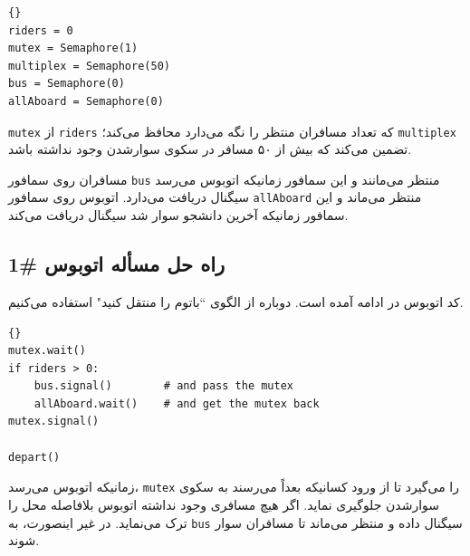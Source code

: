 \documentclass{book}
\newcommand{\clearemptydoublepage}{\newpage\cleardoublepage}
\begin{document}
\begin{latin}
\begin{lstlisting}[title=\rl{راهنمای مسأله اتوبوس}]{}
riders = 0
mutex = Semaphore(1)
multiplex = Semaphore(50)
bus = Semaphore(0)
allAboard = Semaphore(0)
\end{lstlisting}
\end{latin}

    {\tt mutex}
    از  {\tt riders} که تعداد مسافران منتظر را نگه می‌دارد محافظ می‌کند؛ {\tt multiplex} تضمین می‌کند که بیش از ۵۰ مسافر در 
    سکوی  سوارشدن وجود نداشته باشد. 
    

    مسافران روی سمافور {\tt bus} منتظر می‌مانند و این سمافور زمانیکه اتوبوس می‌رسد سیگنال دریافت می‌دارد. 
    اتوبوس روی سمافور {\tt allAboard} منتظر می‌ماند و این سمافور زمانیکه آخرین دانشجو سوار شد سیگنال دریافت می‌کند. 


\clearemptydoublepage
\subsection {راه حل مسأله اتوبوس \#1}

    کد اتوبوس در ادامه آمده است. دوباره از الگوی ``باتوم را منتقل کنید" استفاده می‌کنیم. 

\begin{latin}
\begin{lstlisting}[title=\rl{راه حل مسأله اتوبوس (اتوبوس)}]{}
mutex.wait()
if riders > 0:
    bus.signal()        # and pass the mutex
    allAboard.wait()    # and get the mutex back
mutex.signal()

depart()
\end{lstlisting}
\end{latin}

    زمانیکه اتوبوس می‌رسد، {\tt mutex} را می‌گیرد تا از ورود کسانیکه بعداً می‌رسند به سکوی سوارشدن جلوگیری نماید.
    اگر هیچ مسافری وجود نداشته اتوبوس بلافاصله محل را ترک می‌نماید. در غیر اینصورت، به {\tt bus} سیگنال داده و 
    منتظر می‌ماند تا مسافران سوار شوند. 
\end{document}

